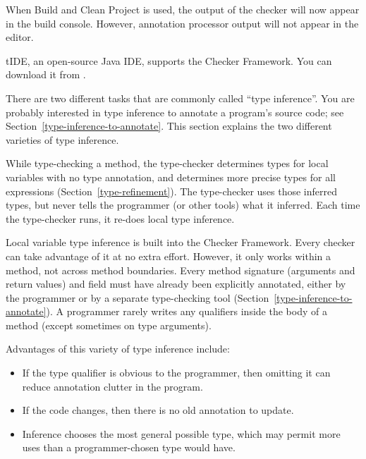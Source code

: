 \begin{enumerate}
When Build and Clean Project is used, the output of the checker will
now appear in the build console. However, annotation processor output
will not appear in the editor.

\end{enumerate}



\begin{sloppypar}
tIDE, an open-source Java IDE, supports the Checker Framework.
You can download it from .
\end{sloppypar}



There are two different tasks that are commonly called ``type inference''.
You are probably interested in type inference to annotate a program's
source code; see Section~\ref{type-inference-to-annotate}.  This section
explains the two different varieties of type inference.



While type-checking a method, the
type-checker determines types for local variables with no type
annotation, and determines more precise types for all expressions (Section~\ref{type-refinement}).
The type-checker uses those inferred types, but never tells the
programmer (or other tools) what it inferred.  Each time the
type-checker runs, it re-does local type inference.

Local variable type inference is built into the Checker Framework.  Every
checker can take advantage of it at no extra effort.  However, it only
works within a method, not across method boundaries.
%
Every method
signature (arguments and return values) and field must have already been explicitly annotated,
either by the programmer or by a separate type-checking tool
(Section~\ref{type-inference-to-annotate}).
A
programmer rarely writes any qualifiers
inside the body of a method (except sometimes on type arguments).


Advantages of this variety of type inference include:
\begin{itemize}
\item
  If the type qualifier is obvious to the programmer, then omitting it
  can reduce annotation clutter in the program.
\item
  If the code changes, then there is no old annotation to update.
\item
  Inference chooses the most general possible type, which may permit more
  uses than a programmer-chosen type would have.
\end{itemize}


